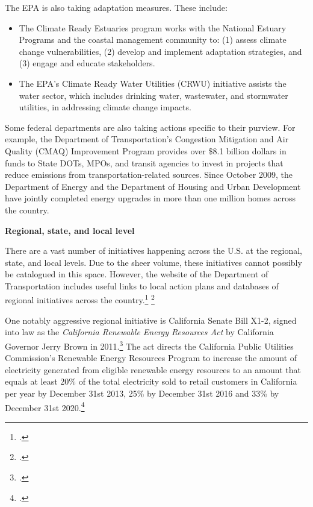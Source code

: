 The EPA is also taking adaptation measures. These include:	
\begin{itemize}
	\item The Climate Ready Estuaries program works with the National Estuary Programs and the coastal management community to: (1) assess climate change vulnerabilities, (2) develop and implement adaptation strategies, and (3) engage and educate stakeholders.
	\item The EPA's Climate Ready Water Utilities (CRWU) initiative assists the water sector, which includes drinking water, wastewater, and stormwater utilities, in addressing climate change impacts.
\end{itemize}
	
	

Some federal departments are also taking actions specific to their purview. For example, the Department of Transportation’s Congestion Mitigation and Air Quality (CMAQ) Improvement Program provides over \$8.1 billion dollars in funds to State DOTs, MPOs, and transit agencies to invest in projects that reduce emissions from transportation-related sources.  Since October 2009, the Department of Energy and the Department of Housing and Urban Development have jointly completed energy upgrades in more than one million homes across the country.



\textbf{Regional, state, and local level}



There are a vast number of initiatives happening across the U.S. at the regional, state, and local levels. 
Due to the sheer volume, these initiatives cannot possibly be catalogued in this space. 
However, the website of the Department of Transportation includes useful links to local action plans and databases of regional initiatives across the country.\footcite[][]{USDTaction} \footcite[][]{USDTinitiatives}



One notably aggressive regional initiative is California Senate Bill X1-2, signed into law as the \emph{California Renewable Energy Resources Act} by California Governor Jerry Brown in 2011.\footcite[][]{CaliSBX12}
The act directs the California Public Utilities Commission's Renewable Energy Resources Program to increase the amount of electricity generated from eligible renewable energy resources to an amount that equals at least 20\% of the total electricity sold to retail customers in California per year by December 31st 2013, 25\% by December 31st 2016 and 33\% by December 31st 2020.\footcite[][]{CaliforniaRenewableOverview}


